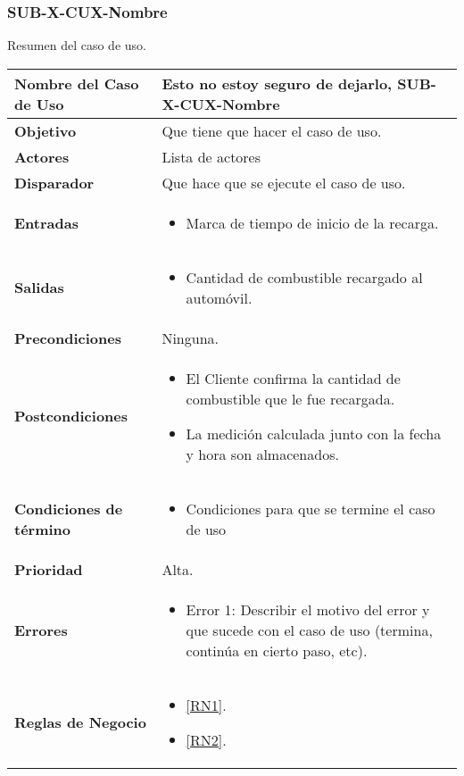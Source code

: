 \subsubsection{SUB-X-CUX-Nombre}
Resumen del caso de uso.
\begin{longtable}{|J{5cm}|J{10.3cm}|}
	\hline
	\textbf{Nombre del Caso de Uso} &
		Esto no estoy seguro de dejarlo, SUB-X-CUX-Nombre \\ \hline
	\textbf{Objetivo} &
		Que tiene que hacer el caso de uso. \\ \hline
	\textbf{Actores} &
		Lista de actores \\ \hline 
	\textbf{Disparador} & 
		Que hace que se ejecute el caso de uso. \\ \hline 
	\textbf{Entradas} & 
		\begin{itemize}
				\item Marca de tiempo de inicio de la recarga.
		\end{itemize}\\ \hline 
	\textbf{Salidas} & 
		\begin{itemize}
			\item Cantidad de combustible recargado al automóvil.
		\end{itemize} \\ \hline
	\textbf{Precondiciones} &
		Ninguna.\\ \hline
	\textbf{Postcondiciones} &
		\begin{itemize}
			\item El Cliente confirma la cantidad de combustible que le fue recargada.
			\item La medición calculada junto con la fecha y hora son almacenados.
		\end{itemize}\\ \hline
	\textbf{Condiciones de término} & 
		\begin{itemize}
			\item Condiciones para que se termine el caso de uso
		\end{itemize} \\ \hline 
	\textbf{Prioridad} & 
		Alta. \\ \hline
	\textbf{Errores} & 
		\begin{itemize}
			\item \label{SUB-M-CU1:Error1} Error 1: Describir el motivo del error y que sucede con el caso de uso (termina, continúa en cierto paso, etc).
		\end{itemize} \\ \hline
	\textbf{Reglas de Negocio} & 
		\begin{itemize}
			\item \ref{RN1}.
			\item \ref{RN2}.
		\end{itemize} \\ \hline

\end{longtable}

